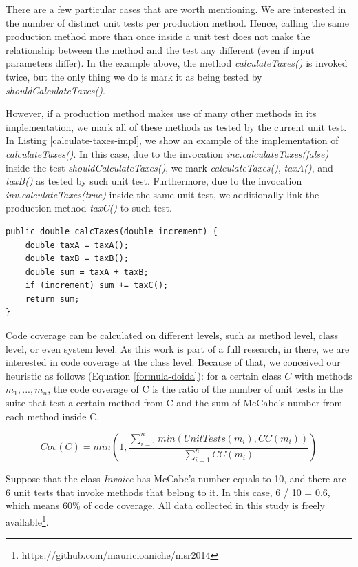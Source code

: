\documentclass{sig-alternate}
\begin{document}
There are a few particular cases that are worth mentioning. We are interested in the number 
of distinct unit tests per production method. Hence, calling the same production method
more than once inside a unit test does not make the relationship between the method 
and the test any different (even if input parameters differ). In the example above, the 
method \textit{calculateTaxes()} is invoked twice, but the only thing we do is mark it 
as being tested by \textit{shouldCalculateTaxes()}.

However, if a production method makes use of many other methods in its implementation,
we mark all of these methods as tested by the current unit test. In Listing \ref{calculate-taxes-impl},
we show an example of the implementation of \textit{calculateTaxes()}. In this case, due to the 
invocation \textit{inc.calculateTaxes(false)} inside the test \textit{shouldCalculateTaxes()}, 
we mark \textit{calculateTaxes()}, \textit{taxA()}, and \textit{taxB()} as tested 
by such unit test. Furthermore, due to the invocation \textit{inv.calculateTaxes(true)} inside
the same unit test, we additionally link the production method \textit{taxC()} to such test.

\begin{lstlisting}
public double calcTaxes(double increment) {
	double taxA = taxA();
	double taxB = taxB();
	double sum = taxA + taxB;
	if (increment) sum += taxC();
	return sum;
}
\end{lstlisting}

Code coverage can be calculated on different levels, such as method level, class level, or even
system level. As this work is part of a full research, in there, we are interested in code coverage at the class level.
Because of that, we conceived our heuristic as follows (Equation \ref{formula-doida}): 
for a certain class $C$ with methods $m_1, ..., m_n$, 
the code coverage of C is the ratio of the number of unit tests in the suite that test a certain method from C and 
the sum of McCabe's number from each method inside C.

\begin{equation}
\label{formula-doida}
Cov(C) = min(1,\frac{\sum_{i=1}^{n}min(UnitTests(m_i), CC(m_i))}{\sum_{i=1}^{n}{CC(m_i)}})
\end{equation}

Suppose that the class \textit{Invoice} has McCabe's number equals to 10, 
and there are 6 unit tests that invoke methods that belong to it. 
In this case, 6 / 10 = 0.6, which means 60\% of code coverage.
All data collected in this study is freely available\footnote{https://github.com/mauricioaniche/msr2014}.
\end{document}
